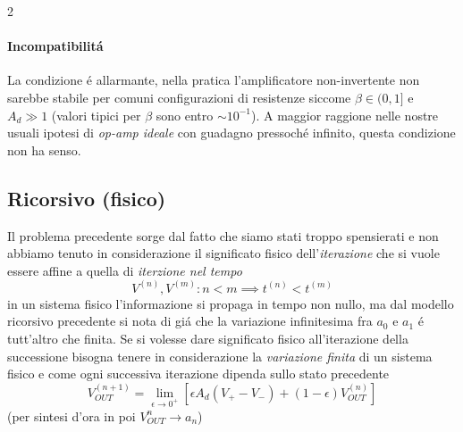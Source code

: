 \begin{multicols}{2}
  \paragraph{Incompatibilit\'a}
  La condizione \'e allarmante, nella pratica l'amplificatore non-invertente non sarebbe
  stabile per comuni configurazioni di resistenze siccome $\beta \in (0, 1]$ e $A_d \gg 1$
  (valori tipici per $\beta$ sono entro $\sim 10^{-1}$). A maggior raggione nelle nostre
  usuali ipotesi di \textit{op-amp ideale} con guadagno pressoch\'e infinito, questa
  condizione non ha senso.

  \subsection*{Ricorsivo (fisico)}
  Il problema precedente sorge dal fatto che siamo stati troppo spensierati e non abbiamo
  tenuto in considerazione il significato fisico dell'\textit{iterazione} che si vuole essere
  affine a quella di \textit{iterzione nel tempo}
  \begin{equation*}
    V^{(n)}, V^{(m)} \colon n < m \implies t^{(n)} < t^{(m)}
  \end{equation*}
  in un sistema fisico l'informazione si propaga in tempo non nullo, ma dal modello ricorsivo
  precedente si nota di gi\'a che la variazione infinitesima fra $a_0$ e $a_1$ \'e tutt'altro che
  finita.
  Se si volesse dare significato fisico all'iterazione della successione bisogna tenere in
  considerazione la \textit{variazione finita} di un sistema fisico e come ogni successiva
  iterazione dipenda sullo stato precedente
  \begin{equation}
    \label{eq:feedback-fisico}
    \boxed{V_{OUT}^{(n+1)} = \lim_{\epsilon \to 0^+} \left[\epsilon A_d(V_+ - V_-) + (1-\epsilon)V_{OUT}^{(n)}\right]}
  \end{equation}
  (per sintesi d'ora in poi $V_{OUT}^{n} \to a_n$)


\end{multicols}

